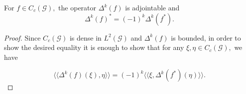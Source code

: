 \documentclass[10pt,a4paper]{amsart}
\begin{document}
			\begin{prop}\label{prop21}
				For $f \in C_c (\mathcal G),$ the operator $\Delta^k (f)$ is adjointable and 
				$$\Delta^k (f)^{\ast} = (-1)^k \Delta^k (f^{\ast}).$$ 
			\end{prop}

			\begin{proof}
				Since $C_c (\mathcal G)$ is dense in $L^2 (\mathcal G)$ and $\Delta^k (f)$ is bounded, in order to show the desired equality it is enough to show that for any $\xi, \eta \in C_c (\mathcal G),$ we have 
				
				$$\bigl \langle \bigl \langle \Delta^k (f) (\xi), \eta \bigr \rangle \bigr \rangle = (-1)^k \bigl \langle \bigl \langle \xi, \Delta^k (f^{\ast}) (\eta) \bigr \rangle \bigr \rangle.$$
				

\end{proof}
\end{document}
